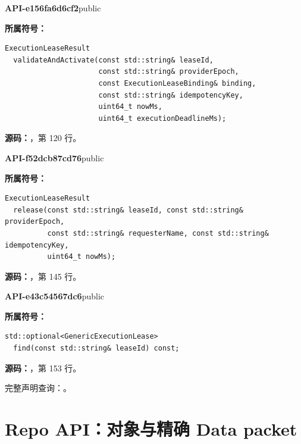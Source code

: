 \textbf{API-e156fa6d6cf2}\quad public\par
\textbf{所属符号：}\par
\begin{Verbatim}[fontsize=\footnotesize,breaklines,breakanywhere]
ExecutionLeaseResult
  validateAndActivate(const std::string& leaseId,
                      const std::string& providerEpoch,
                      const ExecutionLeaseBinding& binding,
                      const std::string& idempotencyKey,
                      uint64_t nowMs,
                      uint64_t executionDeadlineMs);
\end{Verbatim}
\textbf{源码：}，第 120 行。\par

\textbf{API-f52dcb87cd76}\quad public\par
\textbf{所属符号：}\par
\begin{Verbatim}[fontsize=\footnotesize,breaklines,breakanywhere]
ExecutionLeaseResult
  release(const std::string& leaseId, const std::string& providerEpoch,
          const std::string& requesterName, const std::string& idempotencyKey,
          uint64_t nowMs);
\end{Verbatim}
\textbf{源码：}，第 145 行。\par

\textbf{API-e43c54567dc6}\quad public\par
\textbf{所属符号：}\par
\begin{Verbatim}[fontsize=\footnotesize,breaklines,breakanywhere]
std::optional<GenericExecutionLease>
  find(const std::string& leaseId) const;
\end{Verbatim}
\textbf{源码：}，第 153 行。\par

完整声明查询：。

\section{Repo API：对象与精确 Data packet}

